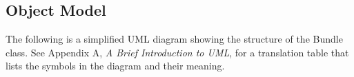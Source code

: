 
\pagebreak
\subsection{Object Model}

The following is a simplified UML diagram showing the structure of the
Bundle class.  See Appendix A, {\it A Brief Introduction to UML},
for a translation table that lists the symbols in the diagram and their 
meaning.

